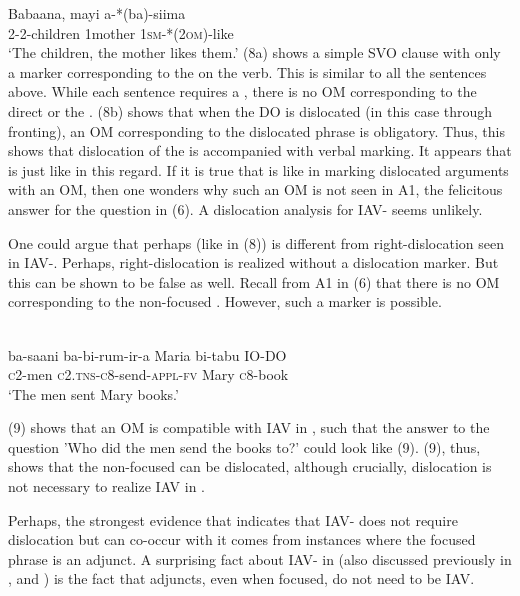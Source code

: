 \documentclass[output=paper,newtxmath,modfonts,nonflat,draft]{langsci/langscibook}
\begin{document}
\ex\label{ex:selvanathan:8b}
\gll Babaana,   mayi     a-*(ba)-siima\\
	2-2-children   1mother   \textsc{1sm}{}-*(\textsc{2om})-like \\
\glt `The children, the mother likes them.' 
\z
\z
(8a) shows a simple SVO clause with only a marker corresponding to the  on the verb. This is similar to all the  sentences above. While each sentence requires a , there is no OM corresponding to the direct or the . (8b) shows that when the DO is dislocated (in this case through fronting), an OM corresponding to the dislocated phrase is obligatory. Thus, this shows that dislocation of the  is accompanied with verbal marking. It appears that  is just like  in this regard. If it is true that  is like  in marking dislocated arguments with an OM, then one wonders why such an OM is not seen in A1, the felicitous answer for the question in (6). A dislocation analysis for  IAV- seems unlikely. 

One could argue that perhaps  (like in (8)) is different from right-dislocation seen in IAV-. Perhaps, right-dislocation is realized without a dislocation marker. But this can be shown to be false as well. Recall from A1 in (6) that there is no OM corresponding to the non-focused . However, such a marker is possible. 

\ea\label{ex:selvanathan:9}
\\
\gll ba-saani    ba-bi-rum-ir-a           Maria   bi-tabu    IO-DO \\
\textsc{c}2-men      \textsc{c}2.\textsc{tns}{}-\textsc{c}8-send-\textsc{appl}{}-\textsc{fv}  Mary     \textsc{c}8-book  \\ 
\glt `The men sent Mary books.'
\z

(9) shows that an OM is compatible with IAV  in , such that the answer to the question 'Who did the men send the books to?' could look like (9). (9), thus, shows that the non-focused  can be dislocated, although crucially, dislocation is not necessary to realize IAV  in .

Perhaps, the strongest evidence that indicates that  IAV- does not require dislocation but can co-occur with it comes from instances where the focused phrase is an adjunct. A surprising fact about IAV- in  (also discussed previously in \citet{Carstens2013}, and \citet{safirforthcoming}) is the fact that  adjuncts, even when focused, do not need to be IAV.
\end{document}
